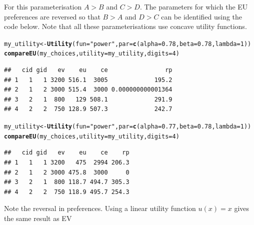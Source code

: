 \documentclass{article}\usepackage[]{graphicx}\usepackage[]{color}
\makeatletter
\newcommand{\hlnum}[1]{\textcolor[rgb]{0.686,0.059,0.569}{#1}}%
\newcommand{\hlstr}[1]{\textcolor[rgb]{0.192,0.494,0.8}{#1}}%
\newcommand{\hlstd}[1]{\textcolor[rgb]{0.345,0.345,0.345}{#1}}%
\newcommand{\hlkwb}[1]{\textcolor[rgb]{0.69,0.353,0.396}{#1}}%
\newcommand{\hlkwc}[1]{\textcolor[rgb]{0.333,0.667,0.333}{#1}}%
\newcommand{\hlkwd}[1]{\textcolor[rgb]{0.737,0.353,0.396}{\textbf{#1}}}%
\newenvironment{kframe}{%
 \def\at@end@of@kframe{}%
 \ifinner\ifhmode%
  \def\at@end@of@kframe{\end{minipage}}%
  \begin{minipage}{\columnwidth}%
 \fi\fi%
 \def\FrameCommand##1{\hskip\@totalleftmargin \hskip-\fboxsep
 \colorbox{shadecolor}{##1}\hskip-\fboxsep
     \hskip-\linewidth \hskip-\@totalleftmargin \hskip\columnwidth}%
 \MakeFramed {\advance\hsize-\width
   \@totalleftmargin\z@ \linewidth\hsize
   \@setminipage}}%
 {\par\unskip\endMakeFramed%
 \at@end@of@kframe}
\newenvironment{knitrout}{}{} %
\makeatother
\begin{document}
For this parameterisation $A > B$ and $C > D$.
The parameters for which the EU preferences are reversed so that $B > A$ and $D > C$ can be identified using
the code below. Note that all these parameterisations use concave utility functions.

\begin{knitrout}
\color{fgcolor}\begin{kframe}
\begin{alltt}
\hlstd{my_utility} \hlkwb{<-} \hlkwd{Utility}\hlstd{(}\hlkwc{fun}\hlstd{=}\hlstr{"power"}\hlstd{,} \hlkwc{par}\hlstd{=}\hlkwd{c}\hlstd{(}\hlkwc{alpha}\hlstd{=}\hlnum{0.78}\hlstd{,} \hlkwc{beta}\hlstd{=}\hlnum{0.78}\hlstd{,} \hlkwc{lambda}\hlstd{=}\hlnum{1}\hlstd{))}
\hlkwd{compareEU}\hlstd{(my_choices,} \hlkwc{utility}\hlstd{=my_utility,} \hlkwc{digits}\hlstd{=}\hlnum{4}\hlstd{)}
\end{alltt}
\begin{verbatim}
##   cid gid   ev    eu    ce                rp
## 1   1   1 3200 516.1  3005             195.2
## 2   1   2 3000 515.4  3000 0.000000000001364
## 3   2   1  800   129 508.1             291.9
## 4   2   2  750 128.9 507.3             242.7
\end{verbatim}
\end{kframe}
\end{knitrout}


\begin{knitrout}
\color{fgcolor}\begin{kframe}
\begin{alltt}
\hlstd{my_utility} \hlkwb{<-} \hlkwd{Utility}\hlstd{(}\hlkwc{fun}\hlstd{=}\hlstr{"power"}\hlstd{,} \hlkwc{par}\hlstd{=}\hlkwd{c}\hlstd{(}\hlkwc{alpha}\hlstd{=}\hlnum{0.77}\hlstd{,} \hlkwc{beta}\hlstd{=}\hlnum{0.78}\hlstd{,} \hlkwc{lambda}\hlstd{=}\hlnum{1}\hlstd{))}
\hlkwd{compareEU}\hlstd{(my_choices,} \hlkwc{utility}\hlstd{=my_utility,} \hlkwc{digits}\hlstd{=}\hlnum{4}\hlstd{)}
\end{alltt}
\begin{verbatim}
##   cid gid   ev    eu    ce    rp
## 1   1   1 3200   475  2994 206.3
## 2   1   2 3000 475.8  3000     0
## 3   2   1  800 118.7 494.7 305.3
## 4   2   2  750 118.9 495.7 254.3
\end{verbatim}
\end{kframe}
\end{knitrout}


Note the reversal in preferences. Using a linear utility function $u(x) = x$ gives the same result as EV
\end{document}

